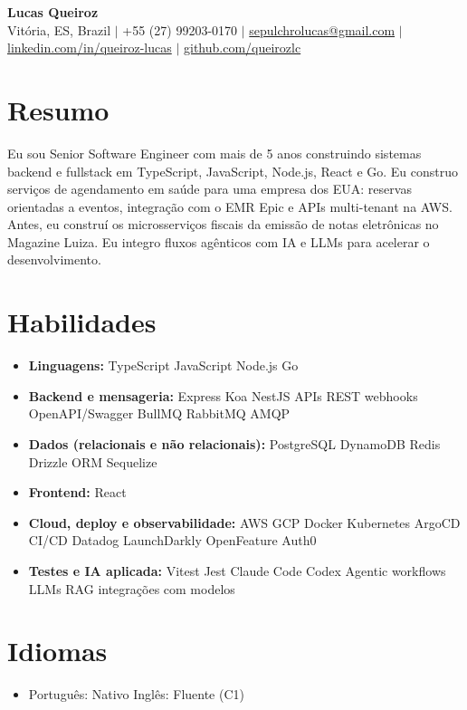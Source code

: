\documentclass[letterpaper,10pt]{article}
\newcommand{\resumeItem}[1]{\item\small{#1}}
\newcommand{\resumeSubHeadingList}{\begin{itemize}[leftmargin=0.15in, label={}, nosep, beginpenalty=10000]}
\newcommand{\resumeSubHeadingListEnd}{\end{itemize}}
\begin{document}
\begin{center}
  \textbf{\Huge Lucas Queiroz} \\[3pt]
  \small Vit\'oria, ES, Brazil $|$ +55 (27) 99203-0170 $|$ \href{mailto:sepulchrolucas@gmail.com}{sepulchrolucas@gmail.com} $|$
  \href{https://linkedin.com/in/queiroz-lucas}{linkedin.com/in/queiroz-lucas} $|$
  \href{https://github.com/queirozlc}{github.com/queirozlc}
\end{center}
\vspace{2pt}

\section{Resumo}
Eu sou Senior Software Engineer com mais de 5 anos construindo sistemas backend e fullstack em TypeScript, JavaScript, Node.js, React e Go. Eu construo servi\c{c}os de agendamento em sa\'ude para uma empresa dos EUA: reservas orientadas a eventos, integra\c{c}\~ao com o EMR Epic e APIs multi-tenant na AWS. Antes, eu constru\'i os microsservi\c{c}os fiscais da emiss\~ao de notas eletr\^onicas no Magazine Luiza. Eu integro fluxos ag\^enticos com IA e LLMs para acelerar o desenvolvimento.

\section{Habilidades}
\resumeSubHeadingList
\resumeItem{\textbf{Linguagens:} TypeScript \textbar{} JavaScript \textbar{} Node.js \textbar{} Go}
\resumeItem{\textbf{Backend e mensageria:} Express \textbar{} Koa \textbar{} NestJS \textbar{} APIs REST \textbar{} webhooks \textbar{} OpenAPI/Swagger \textbar{} BullMQ \textbar{} RabbitMQ \textbar{} AMQP}
\resumeItem{\textbf{Dados (relacionais e n\~ao relacionais):} PostgreSQL \textbar{} DynamoDB \textbar{} Redis \textbar{} Drizzle ORM \textbar{} Sequelize}
\resumeItem{\textbf{Frontend:} React}
\resumeItem{\textbf{Cloud, deploy e observabilidade:} AWS \textbar{} GCP \textbar{} Docker \textbar{} Kubernetes \textbar{} ArgoCD \textbar{} CI/CD \textbar{} Datadog \textbar{} LaunchDarkly \textbar{} OpenFeature \textbar{} Auth0}
\resumeItem{\textbf{Testes e IA aplicada:} Vitest \textbar{} Jest \textbar{} Claude Code \textbar{} Codex \textbar{} Agentic workflows \textbar{} LLMs \textbar{} RAG \textbar{} integra\c{c}\~oes com modelos}\resumeSubHeadingListEnd

\section{Idiomas}
\resumeSubHeadingList
\resumeItem{Portugu\^es: Nativo \textbar{} Ingl\^es: Fluente (C1)}
\resumeSubHeadingListEnd
\end{document}
